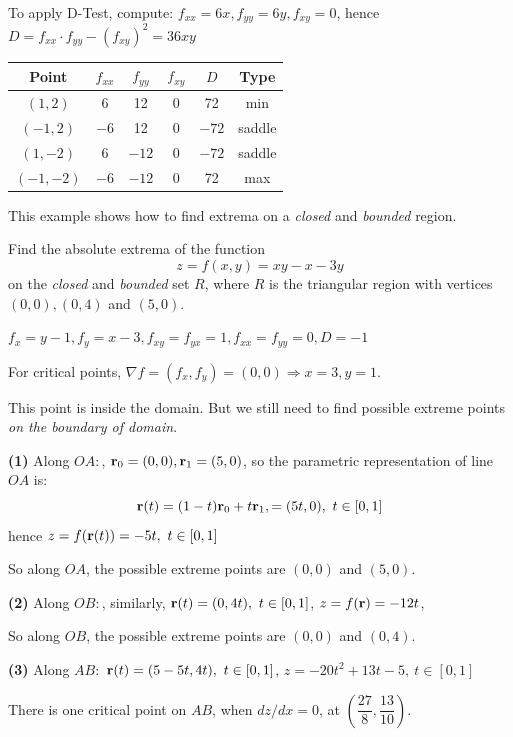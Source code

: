 \begin{spacing}{1.3}
    To apply D-Test, compute:
    $f_{xx}=6x, f_{yy}=6y, f_{xy}=0$, hence $D=f_{xx}\cdot f_{yy}-(f_{xy})^2= 36xy$

    \begin{center}
        \begin{tabular}{c|c|c|c|c|c}\hline\hline
            Point & $f_{xx}$ & $f_{yy}$ & $f_{xy}$ & $D$ & Type\\\hline\hline
            $(1,2)$ & 6 & 12 & 0 & 72 & min \\\hline
            $(-1,2)$ & $-6$ & 12 & 0 & $-72$ & saddle\\\hline
            $(1,-2)$ & 6 & $-12$ & 0 & $-72$ & saddle\\\hline
            $(-1,-2)$ & $-6$ & $-12$ & 0 & 72 & max\\\hline
        \end{tabular}
    \end{center}



    \newpage
    {\blue This example shows how to find extrema on a {\it closed} and {\it bounded} region.}

    \eg Find the absolute extrema of the function
    $$z=f(x, y)=x y-x-3 y$$
    on the {\it closed} and {\it bounded} set $R$, where $R$ is the triangular 
    region with vertices $(0,0),(0,4)$ and $(5,0)$.

    \sol $f_x=y-1, f_y=x-3, f_{xy}=f_{yx}=1, f_{xx}=f_{yy}=0, D=-1$

    For critical points, $\nabla f=(f_x, f_y)=(0,0) \Rightarrow x=3, y=1$.

    This point is inside the domain. But we still need to find possible 
    extreme points {\it on the boundary of domain}.

    {\bf (1)} Along $OA:$, ${\bf r}_0=(0,0), {\bf r}_1=(5,0)$, so the parametric representation 
    of line $OA$ is:
    $$\rr(t)=(1-t)\rr_0+t\rr_1,=(5t, 0),\ t\in [0,1]$$
    hence $z=f(\rr(t))=-5t,\ t\in [0,1]$

    So along $OA$, the possible extreme points are $(0,0)$ and $(5,0)$.

    {\bf (2)} Along $OB:$, similarly, ${\bf r}(t)=(0, 4t),\ t\in [0,1]$, 
    $z=f({\bf r})=-12t$,

    So along $OB$, the possible extreme points are $(0,0)$ and $(0,4)$.

    {\bf (3)} Along $AB:$ ${\bf r}(t)=(5-5t, 4t),\ t\in [0,1]$,
    $z=-20t^2+13t-5,\ t\in [0,1]$

    There is one critical point on $AB$, when $dz/dx=0$, at $\left(\dfrac{27}{8}, \dfrac{13}{10}\right)$.


\end{spacing}
